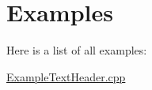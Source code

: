 \section{Examples}
Here is a list of all examples\-:\begin{DoxyCompactItemize}
\item 
\hyperlink{_example_text_header_8cpp-example}{Example\-Text\-Header.\-cpp}
\end{DoxyCompactItemize}
